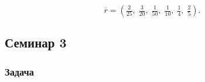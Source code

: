 \[
	\overline r =
	\left(\tfrac{2}{25},\;\tfrac{3}{20},\;\tfrac{1}{50},\;\tfrac{1}{10},\;\tfrac{1}{4},\;\tfrac{2}{5}\right).
\]


\subsection{Семинар 3}

\subsubsection*{Задача}